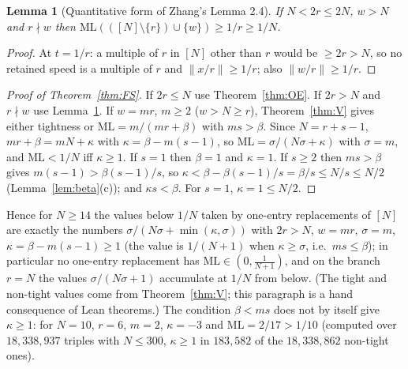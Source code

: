 \documentclass[11pt]{article}
\newtheorem{lemma}[theorem]{Lemma}
\theoremstyle{definition}
\theoremstyle{remark}
\newcommand{\nd}[1]{\lVert #1\rVert}
\newcommand{\ML}{\mathrm{ML}}
\begin{document}
\begin{lemma}[Quantitative form of Zhang's Lemma 2.4]\label{lem:inv}
If $N<2r\le2N$, $w>N$ and $r\nmid w$ then $\ML(([N]\setminus\{r\})\cup\{w\})\ge1/r\ge1/N$.
\end{lemma}
\begin{proof}
At $t=1/r$: a multiple of $r$ in $[N]$ other than $r$ would be $\ge2r>N$, so no retained speed is a multiple of $r$ and $\nd{x/r}\ge1/r$; also $\nd{w/r}\ge1/r$.
\end{proof}

\begin{proof}[Proof of Theorem~\ref{thm:FS}]
If $2r\le N$ use Theorem~\ref{thm:OE}. If $2r>N$ and $r\nmid w$ use Lemma~\ref{lem:inv}. If $w=mr$, $m\ge2$ ($w>N\ge r$), Theorem~\ref{thm:V} gives either tightness or $\ML=m/(mr+\beta)$ with $ms>\beta$. Since $N=r+s-1$, $mr+\beta=mN+\kappa$ with $\kappa=\beta-m(s-1)$, so $\ML=\sigma/(N\sigma+\kappa)$ with $\sigma=m$, and $\ML<1/N$ iff $\kappa\ge1$. If $s=1$ then $\beta=1$ and $\kappa=1$. If $s\ge2$ then $ms>\beta$ gives $m(s-1)>\beta(s-1)/s$, so $\kappa<\beta-\beta(s-1)/s=\beta/s\le N/s\le N/2$ (Lemma~\ref{lem:beta}(c)); and $\kappa s<\beta$. For $s=1$, $\kappa=1\le N/2$.
\end{proof}
Hence for $N\ge14$ the values below $1/N$ taken by one-entry replacements of $[N]$ are exactly the numbers $\sigma/(N\sigma+\min(\kappa,\sigma))$ with $2r>N$, $w=mr$, $\sigma=m$, $\kappa=\beta-m(s-1)\ge1$ (the value is $1/(N+1)$ when $\kappa\ge\sigma$, i.e.\ $ms\le\beta$); in particular no one-entry replacement has $\ML\in(0,\frac1{N+1})$, and on the branch $r=N$ the values $\sigma/(N\sigma+1)$ accumulate at $1/N$ from below. (The tight and non-tight values come from Theorem~\ref{thm:V}; this paragraph is a hand consequence of Lean theorems.) The condition $\beta<ms$ does not by itself give $\kappa\ge1$: for $N=10$, $r=6$, $m=2$, $\kappa=-3$ and $\ML=2/17>1/10$ (computed over $18{,}338{,}937$ triples with $N\le300$, $\kappa\ge1$ in $183{,}582$ of the $18{,}338{,}862$ non-tight ones).
\end{document}
